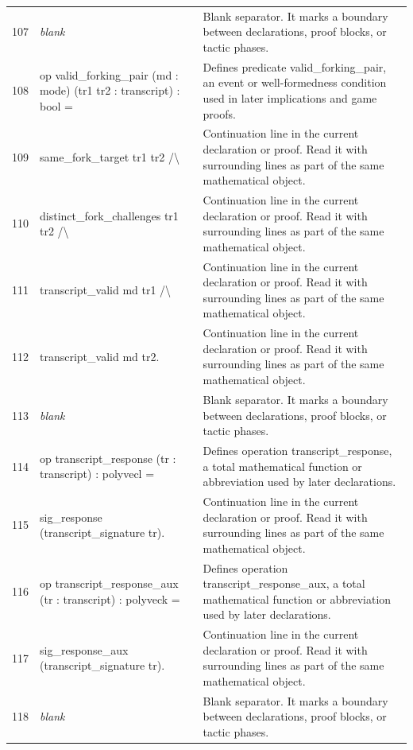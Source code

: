 \documentclass[10pt]{article}
\begin{document}
\begin{longtable}{r L{0.53\textwidth} L{0.37\textwidth}}
107 & {\ttfamily\scriptsize \emph{blank}} & Blank separator.  It marks a boundary between declarations, proof blocks, or tactic phases. \\
108 & {\ttfamily\scriptsize op valid\_forking\_pair (md : mode) (tr1 tr2 : transcript) : bool =} & Defines predicate valid\_forking\_pair, an event or well-formedness condition used in later implications and game proofs. \\
109 & {\ttfamily\scriptsize   same\_fork\_target tr1 tr2 /\textbackslash{}} & Continuation line in the current declaration or proof.  Read it with surrounding lines as part of the same mathematical object. \\
110 & {\ttfamily\scriptsize   distinct\_fork\_challenges tr1 tr2 /\textbackslash{}} & Continuation line in the current declaration or proof.  Read it with surrounding lines as part of the same mathematical object. \\
111 & {\ttfamily\scriptsize   transcript\_valid md tr1 /\textbackslash{}} & Continuation line in the current declaration or proof.  Read it with surrounding lines as part of the same mathematical object. \\
112 & {\ttfamily\scriptsize   transcript\_valid md tr2.} & Continuation line in the current declaration or proof.  Read it with surrounding lines as part of the same mathematical object. \\
113 & {\ttfamily\scriptsize \emph{blank}} & Blank separator.  It marks a boundary between declarations, proof blocks, or tactic phases. \\
114 & {\ttfamily\scriptsize op transcript\_response (tr : transcript) : polyvecl =} & Defines operation transcript\_response, a total mathematical function or abbreviation used by later declarations. \\
115 & {\ttfamily\scriptsize   sig\_response (transcript\_signature tr).} & Continuation line in the current declaration or proof.  Read it with surrounding lines as part of the same mathematical object. \\
116 & {\ttfamily\scriptsize op transcript\_response\_aux (tr : transcript) : polyveck =} & Defines operation transcript\_response\_aux, a total mathematical function or abbreviation used by later declarations. \\
117 & {\ttfamily\scriptsize   sig\_response\_aux (transcript\_signature tr).} & Continuation line in the current declaration or proof.  Read it with surrounding lines as part of the same mathematical object. \\
118 & {\ttfamily\scriptsize \emph{blank}} & Blank separator.  It marks a boundary between declarations, proof blocks, or tactic phases. \\

\end{longtable}
\end{document}
